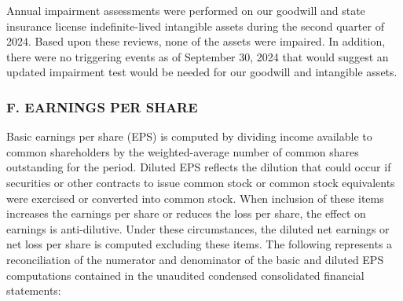 \documentclass{article}
\begin{document}
Annual impairment assessments were performed on our goodwill and state insurance license indefinite-lived intangible assets during the second quarter of 2024. Based upon these reviews, none of the assets were impaired. In addition, there were no triggering events as of September 30, 2024 that would suggest an updated impairment test would be needed for our goodwill and intangible assets.

\subsubsection*{F. EARNINGS PER SHARE}
Basic earnings per share (EPS) is computed by dividing income available to common shareholders by the weighted-average number of common shares outstanding for the period. Diluted EPS reflects the dilution that could occur if securities or other contracts to issue common stock or common stock equivalents were exercised or converted into common stock. When inclusion of these items increases the earnings per share or reduces the loss per share, the effect on earnings is anti-dilutive. Under these circumstances, the diluted net earnings or net loss per share is computed excluding these items. The following represents a reconciliation of the numerator and denominator of the basic and diluted EPS computations contained in the unaudited condensed consolidated financial statements:
\end{document}

